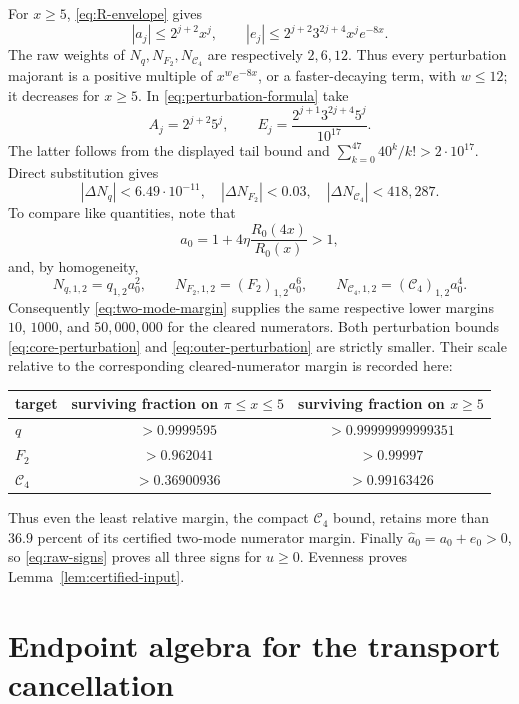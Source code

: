 \documentclass[11pt]{article}
\theoremstyle{remark}
\newcommand{\Cfour}{\mathcal{C}_4}
\numberwithin{equation}{section}
\begin{document}
For \(x\geq5\), \eqref{eq:R-envelope} gives
\[
 |a_j|\leq2^{j+2}x^j,\qquad
 |e_j|\leq2^{j+2}3^{2j+4}x^je^{-8x}.
\]
The raw weights of \(N_q,N_{F_2},N_{\Cfour}\) are respectively \(2,6,12\).
Thus every perturbation majorant is a positive multiple of
\(x^we^{-8x}\), or a faster-decaying term, with \(w\leq12\); it decreases
for \(x\geq5\). In \eqref{eq:perturbation-formula} take
\[
 A_j=2^{j+2}5^j,\qquad
 E_j=\frac{2^{j+1}3^{2j+4}5^j}{10^{17}}.
\]
The latter follows from the displayed tail bound and
\(\sum_{k=0}^{47}40^k/k!>2\cdot10^{17}\). Direct substitution gives
\begin{equation}\label{eq:outer-perturbation}
 |\Delta N_q|<6.49\cdot10^{-11},\quad
 |\Delta N_{F_2}|<0.03,\quad
 |\Delta N_{\Cfour}|<418{,}287.
\end{equation}
To compare like quantities, note that
\[
 a_0=1+4\eta\frac{R_0(4x)}{R_0(x)}>1,
\]
and, by homogeneity,
\[
 N_{q,1,2}=q_{1,2}a_0^2,\qquad
 N_{F_2,1,2}=(F_2)_{1,2}a_0^6,\qquad
 N_{\Cfour,1,2}=(\Cfour)_{1,2}a_0^4.
\]
Consequently \eqref{eq:two-mode-margin} supplies the same respective lower
margins \(10\), \(1000\), and \(50{,}000{,}000\) for the cleared
numerators.  Both perturbation bounds
\eqref{eq:core-perturbation} and \eqref{eq:outer-perturbation} are strictly
smaller. Their scale relative to the corresponding cleared-numerator margin
is recorded here:
\begin{center}
\small
\begin{tabular}{@{}lcc@{}}
\toprule
target & surviving fraction on \(\pi\leq x\leq5\)
       & surviving fraction on \(x\geq5\)\\
\midrule
\(q\) & \(>0.9999595\) & \(>0.99999999999351\)\\
\(F_2\) & \(>0.962041\) & \(>0.99997\)\\
\(\Cfour\) & \(>0.36900936\) & \(>0.99163426\)\\
\bottomrule
\end{tabular}
\end{center}
Thus even the least relative margin, the compact \(\Cfour\) bound, retains
more than \(36.9\) percent of its certified two-mode numerator margin.
Finally \(\widehat a_0=a_0+e_0>0\), so \eqref{eq:raw-signs} proves all three
signs for \(u\geq0\). Evenness proves Lemma~\ref{lem:certified-input}.
\section{Endpoint algebra for the transport cancellation}\label{app:endpoints}
\end{document}
